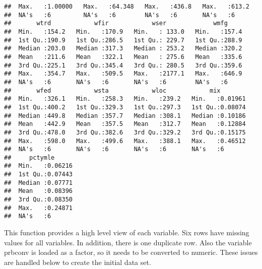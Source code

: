 \documentclass[
]{article}
\newenvironment{Shaded}{\begin{snugshade}}{\end{snugshade}}
\newcommand{\CommentTok}[1]{\textcolor[rgb]{0.56,0.35,0.01}{\textit{#1}}}
\newcommand{\KeywordTok}[1]{\textcolor[rgb]{0.13,0.29,0.53}{\textbf{#1}}}
\newcommand{\NormalTok}[1]{#1}
\newcommand{\OperatorTok}[1]{\textcolor[rgb]{0.81,0.36,0.00}{\textbf{#1}}}
\newcommand{\StringTok}[1]{\textcolor[rgb]{0.31,0.60,0.02}{#1}}
\begin{document}
\begin{verbatim}
##  Max.   :1.00000   Max.   :64.348   Max.   :436.8   Max.   :613.2  
##  NA's   :6         NA's   :6        NA's   :6       NA's   :6      
##       wtrd            wfir            wser             wmfg      
##  Min.   :154.2   Min.   :170.9   Min.   : 133.0   Min.   :157.4  
##  1st Qu.:190.9   1st Qu.:286.5   1st Qu.: 229.7   1st Qu.:288.9  
##  Median :203.0   Median :317.3   Median : 253.2   Median :320.2  
##  Mean   :211.6   Mean   :322.1   Mean   : 275.6   Mean   :335.6  
##  3rd Qu.:225.1   3rd Qu.:345.4   3rd Qu.: 280.5   3rd Qu.:359.6  
##  Max.   :354.7   Max.   :509.5   Max.   :2177.1   Max.   :646.9  
##  NA's   :6       NA's   :6       NA's   :6        NA's   :6      
##       wfed            wsta            wloc            mix         
##  Min.   :326.1   Min.   :258.3   Min.   :239.2   Min.   :0.01961  
##  1st Qu.:400.2   1st Qu.:329.3   1st Qu.:297.3   1st Qu.:0.08074  
##  Median :449.8   Median :357.7   Median :308.1   Median :0.10186  
##  Mean   :442.9   Mean   :357.5   Mean   :312.7   Mean   :0.12884  
##  3rd Qu.:478.0   3rd Qu.:382.6   3rd Qu.:329.2   3rd Qu.:0.15175  
##  Max.   :598.0   Max.   :499.6   Max.   :388.1   Max.   :0.46512  
##  NA's   :6       NA's   :6       NA's   :6       NA's   :6        
##     pctymle       
##  Min.   :0.06216  
##  1st Qu.:0.07443  
##  Median :0.07771  
##  Mean   :0.08396  
##  3rd Qu.:0.08350  
##  Max.   :0.24871  
##  NA's   :6
\end{verbatim}

This function provides a high level view of each variable. Six rows have
missing values for all variables. In addition, there is one duplicate
row. Also the variable prbconv is loaded as a factor, so it needs to be
converted to numeric. These issues are handled below to create the
initial data set.

\begin{Shaded}
\end{Shaded}
\end{document}
